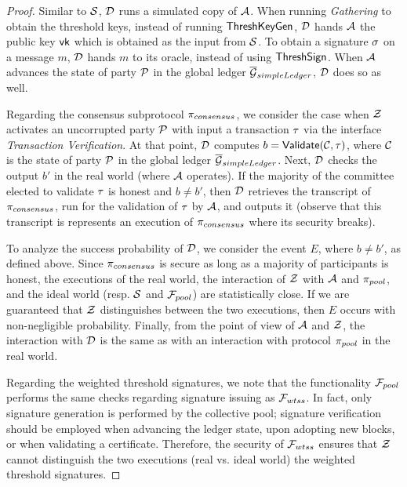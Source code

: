 \begin{proof}
    Similar to $\mathcal{S}$, $\mathcal{D}$ runs a simulated copy of $\mathcal{A}$. When
    running \emph{Gathering} to obtain the threshold keys, instead of running
    $\mathsf{ThreshKeyGen}$, $\mathcal{D}$ hands $\mathcal{A}$ the public key
    $\mathsf{vk}$ which is obtained as the input from $\mathcal{S}$. To obtain a
    signature $\sigma$ on a message $m$, $\mathcal{D}$ hands $m$ to its
    oracle, instead of using $\mathsf{ThreshSign}$. When $\mathcal{A}$ advances the state of
    party $\mathcal{P}$ in the global ledger ${\overline{\mathcal{G}}}_{simpleLedger}$, $\mathcal{D}$ does so as
    well.

    Regarding the consensus subprotocol $\pi_{consensus}$, we consider the case
    when $\mathcal{Z}$ activates an uncorrupted party $\mathcal{P}$ with input a transaction
    $\tau$ via the interface \emph{Transaction Verification}. At that point,
    $\mathcal{D}$ computes $b = \mathsf{Validate}(\mathcal{C}, \tau)$, where $\mathcal{C}$
    is the state of party $\mathcal{P}$ in the global ledger ${\overline{\mathcal{G}}}_{simpleLedger}$. Next,
    $\mathcal{D}$ checks the output $b'$ in the real world (where
    $\mathcal{A}$ operates). If the majority of the committee elected to
    validate $\tau$ is honest and $b \neq b'$, then $\mathcal{D}$ retrieves
    the transcript of $\pi_{consensus}$, run for the validation of $\tau$ by
    $\mathcal{A}$, and outputs it (observe that this transcript is represents an
    execution of $\pi_{consensus}$ where its security breaks).

    To analyze the success probability of $\mathcal{D}$, we consider the
    event $E$, where $b \neq b'$, as defined above. Since $\pi_{consensus}$ is
    secure as long as a majority of participants is honest, the executions of
    the real world, \ie the interaction of $\mathcal{Z}$ with $\mathcal{A}$ and
    $\pi_{pool}$, and the ideal world (resp. $\mathcal{S}$ and ${\mathcal{F}}_{pool}$) are
    statistically close. If we are guaranteed that $\mathcal{Z}$ distinguishes between
    the two executions, then $E$ occurs with non-negligible probability.
    Finally, from the point of view of $\mathcal{A}$ and $\mathcal{Z}$, the interaction
    with $\mathcal{D}$ is the same as with an interaction with protocol
    $\pi_{pool}$ in the real world.

    Regarding the weighted threshold signatures, we note that the functionality
    ${\mathcal{F}}_{pool}$ performs the same checks regarding signature issuing as
    ${\mathcal{F}}_{wtss}$. In fact, only signature generation is performed by the
    collective pool; signature verification should be employed when advancing
    the ledger state, \ie upon adopting new blocks, or when validating a
    certificate. Therefore, the security of ${\mathcal{F}}_{wtss}$ ensures that $\mathcal{Z}$
    cannot distinguish the two executions (real vs. ideal world) \wrt the
    weighted threshold signatures.


\end{proof}
